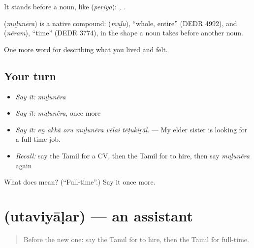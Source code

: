 It stands before a noun, like  (\emph{periya}):  ,  .

\begin{cousinweb}
\textbf{} (\emph{muḻunēra}) is a native compound:  (\emph{muḻu}), \textquotedblleft{}whole, entire\textquotedblright{} (DEDR 4992), and  (\emph{nēram}), \textquotedblleft{}time\textquotedblright{} (DEDR 3774), in the shape a noun takes before another noun.
\end{cousinweb}

\begin{grammarlens}[title={What you've built}]
One more word for describing what you lived and felt.
\end{grammarlens}

\subsection*{Your turn}
\begin{itemize}
\raggedright
  \item \emph{Say it:} \emph{muḻunēra}
  \item \emph{Say it:} \emph{muḻunēra}, once more
  \item \emph{Say it:} \emph{eṉ akkā oru muḻunēra vēlai tēṭukiṟāḷ.} — My elder sister is looking for a full-time job.
  \item \emph{Recall:} say the Tamil for a CV, then the Tamil for to hire, then say \emph{muḻunēra} again
\end{itemize}

\begin{tcolorbox}[breakable,colback=teal!4,colframe=teal!35!black,title={Before you move on}]
What does  mean? (\textquotedblleft{}Full-time\textquotedblright{}.) Say it once more.
\end{tcolorbox}
\section[\texorpdfstring{\ta{உதவியாளர்} (utaviyāḷar)}{உதவியாளர் (utaviyāḷar)}]{ (utaviyāḷar) — an assistant}

\label{lesson:TA-C506-utaviyalar}



\begin{quote}
Before the new one: say the Tamil for to hire, then the Tamil for full-time.
\end{quote}

